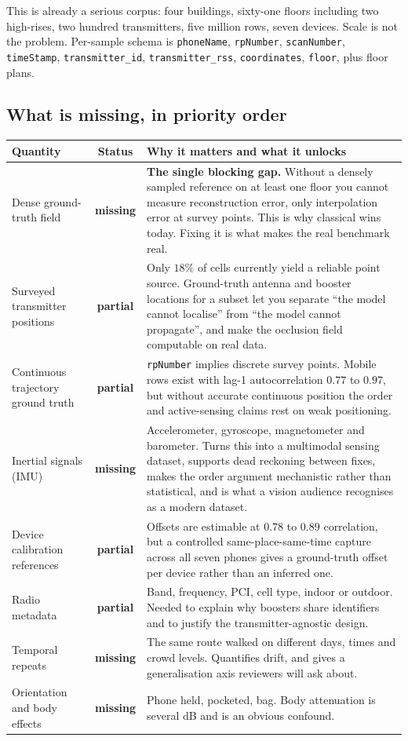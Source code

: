 \documentclass[11pt,a4paper]{article}
\newcommand{\no}{\textcolor{red!70!black}{\textbf{missing}}}
\newcommand{\parti}{\textcolor{orange!80!black}{\textbf{partial}}}
\begin{document}
This is already a serious corpus: four buildings, sixty-one floors including two
high-rises, two hundred transmitters, five million rows, seven devices. Scale is not the
problem. Per-sample schema is
\texttt{phoneName}, \texttt{rpNumber}, \texttt{scanNumber}, \texttt{timeStamp},
\texttt{transmitter\_id}, \texttt{transmitter\_rss}, \texttt{coordinates},
\texttt{floor}, plus floor plans.

\subsection{What is missing, in priority order}

\begin{center}
\small
\renewcommand{\arraystretch}{1.25}
\begin{tabular}{>{\raggedright}p{4.3cm}cp{8.6cm}}
\toprule
Quantity & Status & Why it matters and what it unlocks \\
\midrule
Dense ground-truth field & \no &
\textbf{The single blocking gap.} Without a densely sampled reference on at least one
floor you cannot measure reconstruction error, only interpolation error at survey
points. This is why classical wins today. Fixing it is what makes the real benchmark
real. \\
Surveyed transmitter positions & \parti &
Only $18\%$ of cells currently yield a reliable point source. Ground-truth antenna and
booster locations for a subset let you separate ``the model cannot localise'' from ``the
model cannot propagate'', and make the occlusion field computable on real data. \\
Continuous trajectory ground truth & \parti &
\texttt{rpNumber} implies discrete survey points. Mobile rows exist with lag-1
autocorrelation $0.77$ to $0.97$, but without accurate continuous position the order and
active-sensing claims rest on weak positioning. \\
Inertial signals (IMU) & \no &
Accelerometer, gyroscope, magnetometer and barometer. Turns this into a multimodal
sensing dataset, supports dead reckoning between fixes, makes the order argument
mechanistic rather than statistical, and is what a vision audience recognises as a
modern dataset. \\
Device calibration references & \parti &
Offsets are estimable at $0.78$ to $0.89$ correlation, but a controlled
same-place-same-time capture across all seven phones gives a ground-truth offset per
device rather than an inferred one. \\
Radio metadata & \parti &
Band, frequency, PCI, cell type, indoor or outdoor. Needed to explain why boosters share
identifiers and to justify the transmitter-agnostic design. \\
Temporal repeats & \no &
The same route walked on different days, times and crowd levels. Quantifies drift, and
gives a generalisation axis reviewers will ask about. \\
Orientation and body effects & \no &
Phone held, pocketed, bag. Body attenuation is several dB and is an obvious confound. \\
\bottomrule
\end{tabular}
\end{center}
\end{document}
